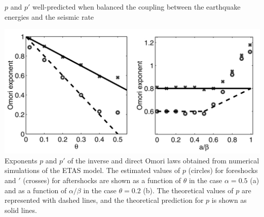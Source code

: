 \documentclass[aspectratio=43,9pt]{beamer}
\begin{document}
\begin{frame}
 {$p$ and $p'$ well-predicted when balanced the coupling between the earthquake energies 
and the seismic rate}
 
   \includegraphics[width=0.8\linewidth]{Figs/fig6}
  Exponents $p$ and $p'$ of the inverse and direct Omori laws obtained from numerical simulations
  of the ETAS model. The estimated values of $p$ (circles) for foreshocks and $'$ (crosses) 
  for aftershocks are shown as a function of $\theta$ in the case $\alpha = 0.5$ (a) and 
  as a function of $\alpha/\beta$ in the case $\theta = 0.2$ (b). The theoretical values of 
  $p$ are represented with dashed lines, and the theoretical prediction for $p$ is shown 
  as solid lines.

 
\end{frame}
\end{document}
